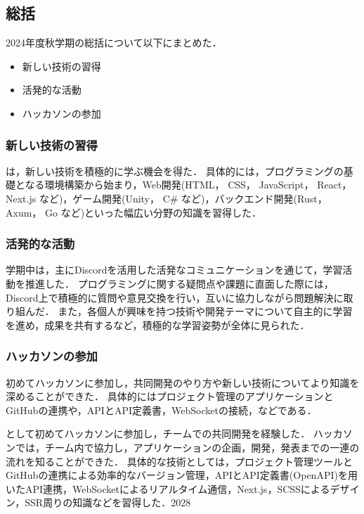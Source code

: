 \subsection*{\firstGrade{}総括}


2024年度秋学期の\firstGrade{}総括について以下にまとめた．

\begin{itemize}
	\item 新しい技術の習得
	\item 活発的な活動
	\item ハッカソンの参加
\end{itemize}

\subsubsection*{新しい技術の習得}

\firstGrade{}は，新しい技術を積極的に学ぶ機会を得た．
具体的には，プログラミングの基礎となる環境構築から始まり，Web開発(HTML， CSS， JavaScript， React， Next.js など)，ゲーム開発(Unity， C\# など)，バックエンド開発(Rust， Axum， Go など)といった幅広い分野の知識を習得した．

\subsubsection*{活発的な活動}

学期中は，主にDiscordを活用した活発なコミュニケーションを通じて，学習活動を推進した．
プログラミングに関する疑問点や課題に直面した際には，Discord上で積極的に質問や意見交換を行い，互いに協力しながら問題解決に取り組んだ．
また，各個人が興味を持つ技術や開発テーマについて自主的に学習を進め，成果を共有するなど，積極的な学習姿勢が全体に見られた．

\subsubsection*{ハッカソンの参加}
初めてハッカソンに参加し，共同開発のやり方や新しい技術についてより知識を深めることができた．
具体的にはプロジェクト管理のアプリケーションとGitHubの連携や，APIとAPI定義書，WebSocketの接続，などである．

\firstGrade{}として初めてハッカソンに参加し，チームでの共同開発を経験した．
ハッカソンでは，チーム内で協力し，アプリケーションの企画，開発，発表までの一連の流れを知ることができた．
具体的な技術としては，プロジェクト管理ツールとGitHubの連携による効率的なバージョン管理，APIとAPI定義書(OpenAPI)を用いたAPI連携，WebSocketによるリアルタイム通信，Next.js，SCSSによるデザイン，SSR周りの知識などを習得した．2028
